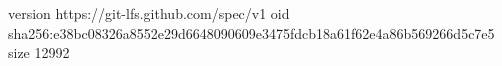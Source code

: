 version https://git-lfs.github.com/spec/v1
oid sha256:e38bc08326a8552e29d6648090609e3475fdcb18a61f62e4a86b569266d5c7e5
size 12992
